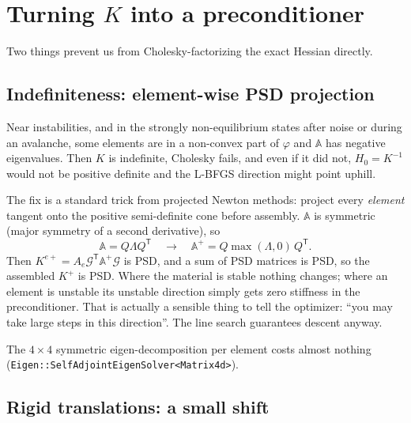 \documentclass[11pt,a4paper]{article}
\theoremstyle{remark}
\newcommand{\T}{^{\mathsf T}}
\newcommand{\code}[1]{\texttt{#1}}
\begin{document}
\section{Turning $K$ into a preconditioner}
\label{sec:psd}

Two things prevent us from Cholesky-factorizing the exact Hessian directly.

\subsection{Indefiniteness: element-wise PSD projection}

Near instabilities, and in the strongly non-equilibrium states after noise or during an
avalanche, some elements are in a non-convex part of $\varphi$ and $\mathbb{A}$ has negative
eigenvalues. Then $K$ is indefinite, Cholesky fails, and even if it did not, $H_0=K^{-1}$ would
not be positive definite and the L-BFGS direction might point uphill.

The fix is a standard trick from projected Newton methods: project every \emph{element}
tangent onto the positive semi-definite cone before assembly. $\mathbb{A}$ is symmetric
(major symmetry of a second derivative), so
\begin{equation}
\mathbb{A} = Q\Lambda Q\T \quad\longrightarrow\quad \mathbb{A}^{+} = Q\max(\Lambda,0)\,Q\T .
\end{equation}
Then $K^{e+} = A_e\mathcal{G}\T\mathbb{A}^+\mathcal{G}$ is PSD, and a sum of PSD matrices is PSD, so
the assembled $K^+$ is PSD. Where the material is stable nothing changes; where an element
is unstable its unstable direction simply gets zero stiffness in the preconditioner. That is
actually a sensible thing to tell the optimizer: ``you may take large steps in this
direction''. The line search guarantees descent anyway.

The $4\times4$ symmetric eigen-decomposition per element costs almost nothing
(\code{Eigen::\allowbreak{}SelfAdjointEigenSolver<Matrix4d>}).

\subsection{Rigid translations: a small shift}
\end{document}
